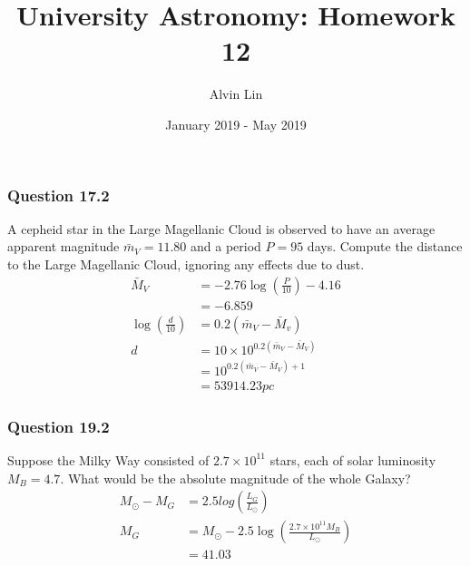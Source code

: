 \documentclass{math}
\title{University Astronomy: Homework 12}
\author{Alvin Lin}
\date{January 2019 - May 2019}
\begin{document}
\maketitle

\subsubsection*{Question 17.2}
A cepheid star in the Large Magellanic Cloud is observed to have an average
apparent magnitude \( \bar{m}_V = 11.80 \) and a period \( P = 95 \) days.
Compute the distance to the Large Magellanic Cloud, ignoring any effects due
to dust.
\begin{align*}
  \bar{M}_V &= -2.76\log\left(\frac{P}{10}\right)-4.16 \\
  &= -6.859 \\
  \log\left(\frac{d}{10}\right) &= 0.2(\bar{m}_V-\bar{M}_v) \\
  d &= 10\times10^{0.2(\bar{m}_V-\bar{M}_V)} \\
  &= 10^{0.2(\bar{m}_V-\bar{M}_V)+1} \\
  &= 53914.23pc
\end{align*}

\subsubsection*{Question 19.2}
Suppose the Milky Way consisted of \( 2.7\times10^{11} \) stars, each of solar
luminosity \( M_B = 4.7 \). What would be the absolute magnitude of the whole
Galaxy?
\begin{align*}
  M_{\odot}-M_G &= 2.5log\left(\frac{L_G}{L_{\odot}}\right) \\
  M_G &= M_{\odot}-2.5\log\left(\frac{2.7\times10^{11}M_B}{L_{\odot}}\right) \\
  &= 41.03
\end{align*}
\end{document}
